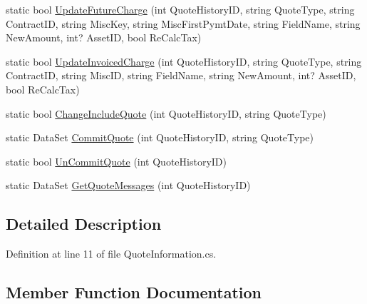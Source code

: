 \begin{DoxyCompactItemize}
\item 
static bool \mbox{\hyperlink{class_g_f_s_c_1_1_services_1_1_end_of_term_1_1_data_1_1_quote_information_a9d542489165e7b3bd1d7e911e4d6e6ea}{Update\+Future\+Charge}} (int Quote\+History\+ID, string Quote\+Type, string Contract\+ID, string Misc\+Key, string Misc\+First\+Pymt\+Date, string Field\+Name, string New\+Amount, int? Asset\+ID, bool Re\+Calc\+Tax)
\item 
static bool \mbox{\hyperlink{class_g_f_s_c_1_1_services_1_1_end_of_term_1_1_data_1_1_quote_information_a9412b7298900ccc6703fc64cc20d4af7}{Update\+Invoiced\+Charge}} (int Quote\+History\+ID, string Quote\+Type, string Contract\+ID, string Misc\+ID, string Field\+Name, string New\+Amount, int? Asset\+ID, bool Re\+Calc\+Tax)
\item 
static bool \mbox{\hyperlink{class_g_f_s_c_1_1_services_1_1_end_of_term_1_1_data_1_1_quote_information_add6fc3465c4dd7ebe30f079bcf710377}{Change\+Include\+Quote}} (int Quote\+History\+ID, string Quote\+Type)
\item 
static Data\+Set \mbox{\hyperlink{class_g_f_s_c_1_1_services_1_1_end_of_term_1_1_data_1_1_quote_information_af4d75a44c56859971bf0b3e3a76b44b6}{Commit\+Quote}} (int Quote\+History\+ID, string Quote\+Type)
\item 
static bool \mbox{\hyperlink{class_g_f_s_c_1_1_services_1_1_end_of_term_1_1_data_1_1_quote_information_a06e50e3c886696c1026ff2358b028e70}{Un\+Commit\+Quote}} (int Quote\+History\+ID)
\item 
static Data\+Set \mbox{\hyperlink{class_g_f_s_c_1_1_services_1_1_end_of_term_1_1_data_1_1_quote_information_a23cfe29495af76c3c84555a2231919a4}{Get\+Quote\+Messages}} (int Quote\+History\+ID)
\end{DoxyCompactItemize}


\subsection{Detailed Description}


Definition at line 11 of file Quote\+Information.\+cs.



\subsection{Member Function Documentation}
\mbox{\label{class_g_f_s_c_1_1_services_1_1_end_of_term_1_1_data_1_1_quote_information_ae0868f4beb582bf840844a32099d6fdc}} 
